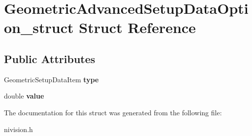 \hypertarget{structGeometricAdvancedSetupDataOption__struct}{
\section{GeometricAdvancedSetupDataOption\_\-struct Struct Reference}
\label{structGeometricAdvancedSetupDataOption__struct}
}
\subsection*{Public Attributes}
\begin{DoxyCompactItemize}
\item 
\hypertarget{structGeometricAdvancedSetupDataOption__struct_a77a7eec40bd17a1a97badce2d02d73e0}{
GeometricSetupDataItem {\bfseries type}}
\label{structGeometricAdvancedSetupDataOption__struct_a77a7eec40bd17a1a97badce2d02d73e0}

\item 
\hypertarget{structGeometricAdvancedSetupDataOption__struct_a8453952cdc360d6dc145c641a29e3231}{
double {\bfseries value}}
\label{structGeometricAdvancedSetupDataOption__struct_a8453952cdc360d6dc145c641a29e3231}

\end{DoxyCompactItemize}


The documentation for this struct was generated from the following file:\begin{DoxyCompactItemize}
\item 
nivision.h\end{DoxyCompactItemize}
